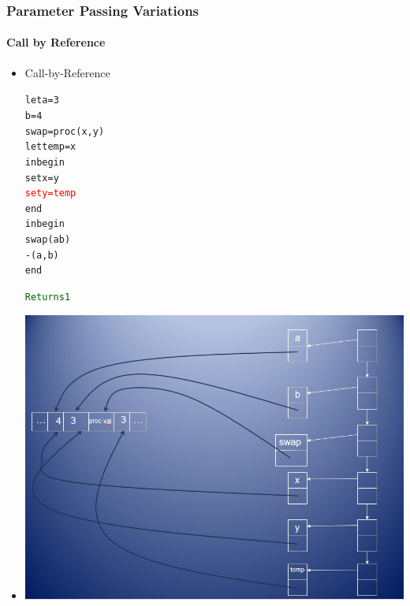 \documentclass{beamer}
\begin{document}
\begin{frame}[fragile]
\frametitle{Parameter Passing Variations}
\framesubtitle{Call by Reference}
\begin{scriptsize}
\begin{itemize}
\item<1-> Call-by-Reference
\begin{alltt}
\begin{tiny}
let a = 3
    b = 4
    swap = proc (x, y)
	        let temp = x
	        in begin
	             set x = y
	             \textcolor{red}{set y = temp}
	           end
in begin
     swap(a b)
     -(a, b)
   end                            \begin{normalsize} \textcolor{darkgreen}{Returns 1} \end{normalsize}
\end{tiny}
\end{alltt}

\item<1->
\begin{center}
\includegraphics[scale=0.35]{cbv-cbr8.jpg}
\end{center}

\end{itemize}
\end{scriptsize}
\end{frame}
\end{document}
